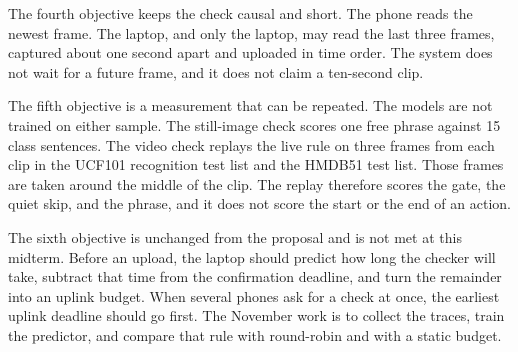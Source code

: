 The fourth objective keeps the check causal and short. The phone reads the
newest frame. The laptop, and only the laptop, may read the last three
frames, captured about one second apart and uploaded in time order. The
system does not wait for a future frame, and it does not claim a
ten-second clip.

The fifth objective is a measurement that can be repeated. The models are
not trained on either sample. The still-image check scores one free phrase
against 15 class sentences. The video check replays the live rule on three
frames from each clip in the UCF101 recognition test list and the HMDB51
test list. Those frames are taken around the middle of the clip. The
replay therefore scores the gate, the quiet skip, and the phrase, and it
does not score the start or the end of an action.

The sixth objective is unchanged from the proposal and is not met at this
midterm. Before an upload, the laptop should predict how long the checker
will take, subtract that time from the confirmation deadline, and turn the
remainder into an uplink budget. When several phones ask for a check at
once, the earliest uplink deadline should go first. The November work is
to collect the traces, train the predictor, and compare that rule with
round-robin and with a static budget.
